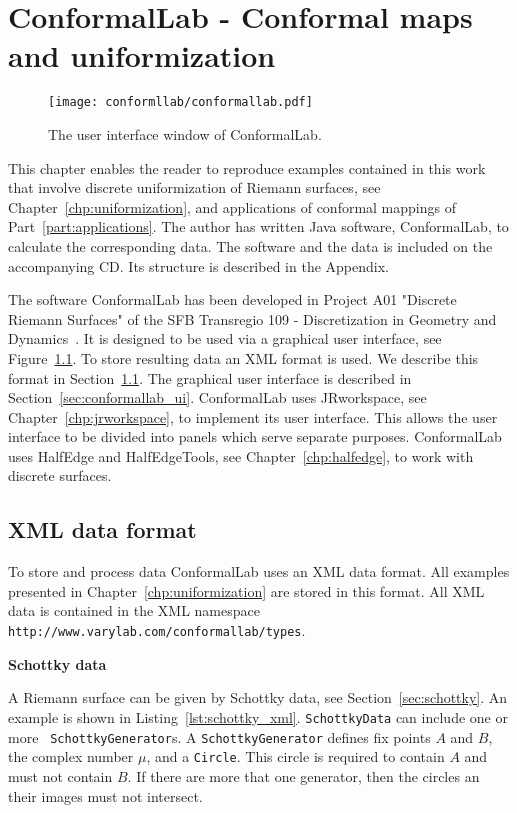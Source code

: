 \documentclass[Thesis.tex]{subfiles}
\begin{document}
\chapter{{\sc ConformalLab} - Conformal maps and uniformization}
\label{chp:conformallab}

\begin{figure}
\centering
\texttt{[image: conformllab/conformallab.pdf]}
\caption{The user interface window of {\sc ConformalLab}.}
\label{fig:conformal_window}
\end{figure}

This chapter enables the reader to reproduce examples contained in this work
that involve discrete uniformization of Riemann surfaces, see
Chapter~\ref{chp:uniformization}, and applications of conformal mappings of
Part~\ref{part:applications}. The author has written {\sc Java} software, {\sc
ConformalLab}, to calculate the corresponding data.  The software and the data
is included on the accompanying CD. Its structure is described in the Appendix. 

The software {\sc ConformalLab} has been developed in Project A01 "Discrete Riemann Surfaces" of the SFB Transregio 109 - Discretization in Geometry and Dynamics~\cite{sfb-webpage}.
It is designed to be used via a graphical user interface, see
Figure~\ref{fig:conformal_window}. To store resulting data an XML format is
used. We describe this format in Section~\ref{sec:conformal_data}. The
graphical user interface is described in Section~\ref{sec:conformallab_ui}.
{\sc ConformalLab} uses {\sc JRworkspace}, see Chapter~\ref{chp:jrworkspace},
to implement its user interface. This allows the user interface to be divided
into panels which serve separate purposes.  {\sc ConformalLab} uses {\sc
HalfEdge} and {\sc HalfEdgeTools}, see Chapter~\ref{chp:halfedge}, to work with
discrete surfaces.


\section{XML data format}
\label{sec:conformal_data}
To store and process data {\sc ConformalLab} uses an {\sc XML} data format.
All examples presented in Chapter~\ref{chp:uniformization} are stored in
this format.  All XML data is contained in the XML namespace {\tt
http://www.varylab.com/conformallab/types}.


{\bf Schottky data} 

A Riemann surface can be given by Schottky data, see Section~\ref{sec:schottky}. 
An example is shown in
Listing~\ref{lst:schottky_xml}. {\tt SchottkyData} can include one or more {\tt
SchottkyGenerator}s. A {\tt SchottkyGenerator} defines fix points $A$ and
$B$, the complex number $\mu$, and a {\tt Circle}. This circle is required to
contain $A$ and must not contain $B$. If there are more that one generator,
then the circles an their images must not intersect.
\end{document}

